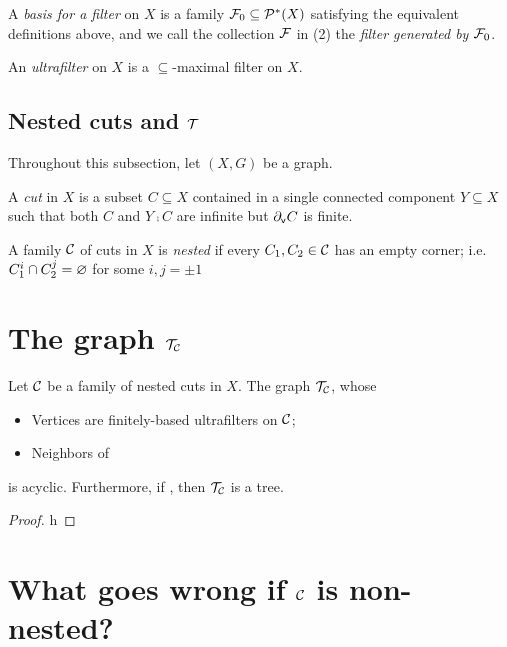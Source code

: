 \documentclass{amsart}
\begin{document}
    \begin{definition}
        A \textit{basis for a filter} on $X$ is a family $\mc{F}_0\subseteq\pow^\ast(X)$ satisfying the equivalent definitions above, and we call the collection $\mc{F}$ in (2) the \textit{filter generated by $\mc{F}_0$}.
    \end{definition}

    \begin{definition}
        An \textit{ultrafilter} on $X$ is a $\subseteq$-maximal filter on $X$.
    \end{definition}

    \subsection{Nested cuts and $\mc{T}$}

    Throughout this subsection, let $(X,G)$ be a graph.

    \begin{definition}
        A \textit{cut} in $X$ is a subset $C\subseteq X$ contained in a single connected component $Y\subseteq X$ such that both $C$ and $Y\comp C$ are infinite but $\del_\mathsf{v}C$ is finite.
    \end{definition}
    \begin{definition}
        A family $\mc{C}$ of cuts in $X$ is \textit{nested} if every $C_1,C_2\in\mc{C}$ has an empty corner; i.e. $C_1^i\cap C_2^j=\em$ for some $i,j=\pm1$
    \end{definition}

    \section{The graph $\mc{T}_\mc{C}$}

    \begin{theorem}
        Let $\mc{C}$ be a family of nested cuts in $X$. The graph $\mc{T}_\mc{C}$, whose
        \begin{itemize}
            \item Vertices are finitely-based ultrafilters on $\mc{C}$;
            \item Neighbors of
        \end{itemize}
        is acyclic. Furthermore, if {\color{red}{something}}, then $\mc{T}_\mc{C}$ is a tree.
    \end{theorem}
    \begin{proof}
        h
    \end{proof}

    \section{What goes wrong if $\mc{C}$ is non-nested?}
\end{document}

